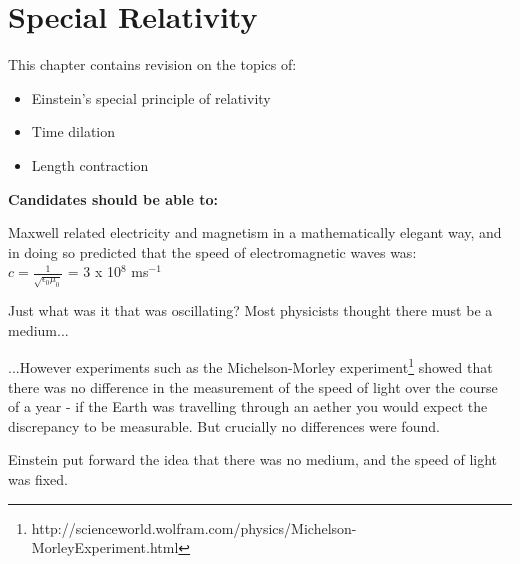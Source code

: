 \documentclass[main.tex]{subfiles}
\begin{document}
\chapter{Special Relativity}

This chapter contains revision on the topics of:

\begin {itemize}
\item Einstein’s special principle of relativity
\item Time dilation
\item Length contraction

\end {itemize}

\textbf{Candidates should be able to:}

Maxwell related electricity and magnetism in a mathematically elegant way, and in doing so predicted that the speed of electromagnetic waves was:
\\
 
$c=\frac{1}{\sqrt{\epsilon_0\mu_0}}$ = 3 x 10$^8$ ms$^{-1}$




Just what was it that was oscillating? Most physicists thought there must be a medium...


...However experiments such as the Michelson-Morley experiment\footnote{http://scienceworld.wolfram.com/physics/Michelson-MorleyExperiment.html} showed that there was no difference in the measurement of the speed of light over the course of a year - if the Earth was travelling through an aether you would expect the discrepancy to be measurable. But crucially no differences were found.



Einstein put forward the idea that there was no medium, and the speed of light was fixed.
\end{document}
